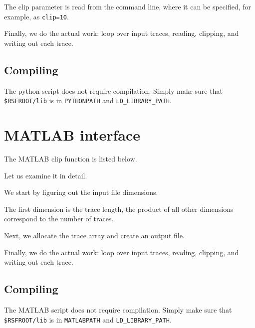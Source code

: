 
The clip parameter is read from the command line, where it can be specified,
for example, as \texttt{clip=10}.


Finally, we do the actual work: loop over input traces, reading,
clipping, and writing out each trace.

\subsection{Compiling}

The python script does not require compilation. Simply make sure that
\texttt{\$RSFROOT/lib} is in \texttt{PYTHONPATH} and
\texttt{LD\_LIBRARY\_PATH}.

\section{MATLAB interface} %

\lstset{language=matlab}
\renewcommand{\rsfclip}{\RSF/api/matlab/test/clip.m}

The MATLAB clip function is listed below.



Let us examine it in detail. 


We start by figuring out the input file dimensions.


The first dimension is the trace length, the product of all other
dimensions correspond to the number of traces.


Next, we allocate the trace array and create an output file.


Finally, we do the actual work: loop over input traces, reading,
clipping, and writing out each trace.

\subsection{Compiling}

The MATLAB script does not require compilation. Simply make sure that
\texttt{\$RSFROOT/lib} is in \texttt{MATLABPATH} and \texttt{LD\_LIBRARY\_PATH}.

